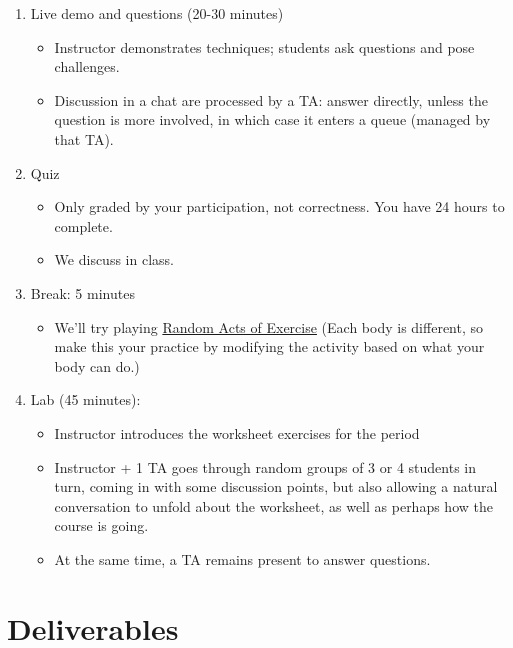 \documentclass[
]{article}
\providecommand{\tightlist}{%
  \setlength{\itemsep}{0pt}\setlength{\parskip}{0pt}}
\begin{document}
\begin{enumerate}
\def\labelenumi{\arabic{enumi}.}
\tightlist
\item
  Live demo and questions (20-30 minutes)

  \begin{itemize}
  \tightlist
  \item
    Instructor demonstrates techniques; students ask questions and pose
    challenges.
  \item
    Discussion in a chat are processed by a TA: answer directly, unless
    the question is more involved, in which case it enters a queue
    (managed by that TA).
  \end{itemize}
\item
  Quiz

  \begin{itemize}
  \tightlist
  \item
    Only graded by your participation, not correctness. You have 24
    hours to complete.
  \item
    We discuss in class.
  \end{itemize}
\item
  Break: 5 minutes

  \begin{itemize}
  \tightlist
  \item
    We'll try playing
    \href{https://www.youtube.com/playlist?list=PL6JWPcX0WhHU97aqiRA4P6Jta9f04Nanm}{Random
    Acts of Exercise} (Each body is different, so make this your
    practice by modifying the activity based on what your body can do.)
  \end{itemize}
\item
  Lab (45 minutes):

  \begin{itemize}
  \tightlist
  \item
    Instructor introduces the worksheet exercises for the period
  \item
    Instructor + 1 TA goes through random groups of 3 or 4 students in
    turn, coming in with some discussion points, but also allowing a
    natural conversation to unfold about the worksheet, as well as
    perhaps how the course is going.
  \item
    At the same time, a TA remains present to answer questions.
  \end{itemize}
\end{enumerate}

\hypertarget{deliverables}{%
\section{Deliverables}\label{deliverables}}
\end{document}
